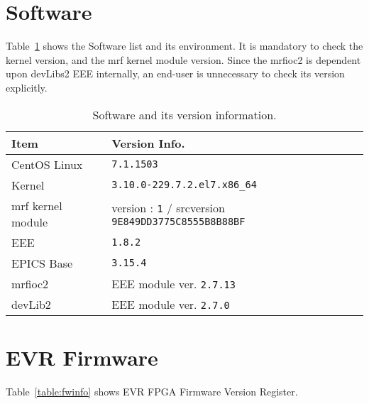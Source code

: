 \documentclass[11pt
  , a4paper
  , article
  , oneside
  , showtrims
]{memoir}
\begin{document}
\section{Software}
Table~\ref{table:swlist} shows the Software list and its environment. It is mandatory to check the kernel version, and the mrf kernel module version. Since the mrfioc2 is dependent upon devLibs2 EEE internally, an end-user is unnecessary to check its version explicitly. 
\begin{table}[!htb]
  \centering
  \begin{tabular}{l|l}
    \toprule
    Item               & Version Info.                                                       \\\midrule
    CentOS Linux       & \texttt{7.1.1503}                                                   \\\midrule
    Kernel             & \texttt{3.10.0-229.7.2.el7.x86\_64}                                 \\\midrule
    mrf kernel module  & version : \texttt{1} / srcversion \texttt{9E849DD3775C8555B8B88BF}  \\\midrule
    EEE                & \texttt{1.8.2}                                                      \\\midrule
    EPICS Base         & \texttt{3.15.4}                                                     \\\midrule
    mrfioc2            & EEE module ver. \texttt{2.7.13}                                     \\\midrule
    devLib2            & EEE module ver. \texttt{2.7.0}                                      \\\bottomrule
  \end{tabular}
  \caption[]{Software and its version information.}
  \label{table:swlist}
\end{table}

\section{EVR Firmware}
Table~\ref{table:fwinfo} shows EVR FPGA Firmware Version Register.
\end{document}
